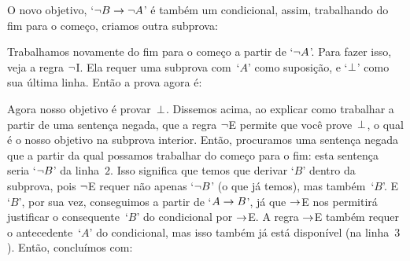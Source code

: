 \begin{fitchproof}
\open
{}
\ellipsesline
{}
\close
{}
\end{fitchproof}
O novo objetivo, `$\neg B \rightarrow \neg A$' \'e  tamb\'em  um  condicional, assim, trabalhando do fim para o come\c co, criamos outra subprova:

\begin{fitchproof}
	\open
	\open
	\ellipsesline
	\close
	\close
\end{fitchproof}
Trabalhamos novamente do fim para o come\c co a partir de `$\neg A$'.  Para fazer isso, veja a regra $\neg$I. Ela requer uma subprova com~`$A$' como suposi\c c\~ao, e `$\bot$' como sua \'ultima linha. Ent\~ao a prova agora \'e:
 
\begin{fitchproof}
	\open
	\open
	\open{}
	\ellipsesline
	\close
	\close
	\close
\end{fitchproof}
Agora nosso objetivo \'e provar~$\bot$. Dissemos acima, ao explicar como trabalhar a partir de uma senten\c ca negada, que a regra $\neg$E permite que voc\^e prove~$\bot$, o qual \'e o nosso objetivo na subprova interior. Ent\~ao, procuramos uma senten\c ca negada  que a partir da qual possamos trabalhar do come\c co para o fim: esta senten\c ca seria `$\neg B$' da linha~$2$. Isso significa que temos que derivar `$B$' dentro da subprova, pois $\neg$E requer n\~ao apenas `$\neg B$' (o que j\'a temos), mas tamb\'em~`$B$'. E `$B$', por sua vez, conseguimos a partir de `$A \rightarrow B$', j\'a que $\rightarrow$E nos permitir\'a justificar o consequente~`$B$' do condicional por $\rightarrow$E. A regra $\rightarrow$E tamb\'em requer o antecedente~`$A$' do condicional, mas isso tamb\'em j\'a est\'a dispon\'ivel (na linha~$3$). Ent\~ao, conclu\'imos  com:


\begin{fitchproof}
	\open
	\open
	\open{}
	\close
	\close
	\close
\end{fitchproof}

